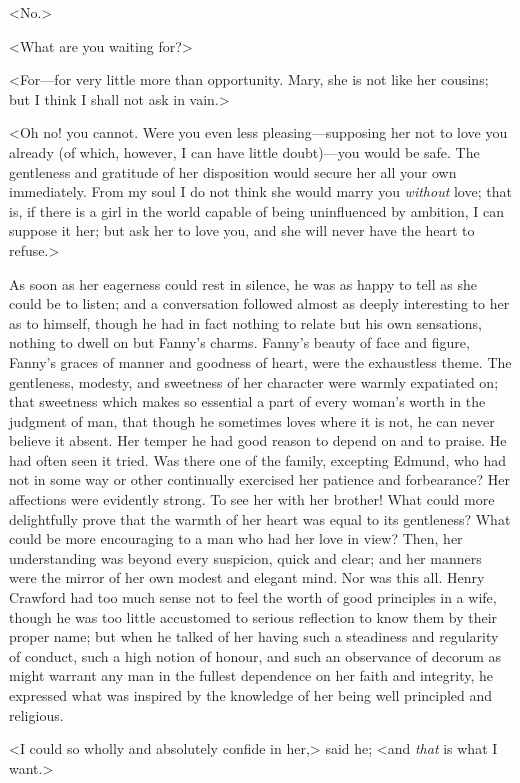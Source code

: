 <No.>

<What are you waiting for?>

<For—for very little more than opportunity. Mary, she is not like her cousins; but I think I shall not ask in vain.>

<Oh no! you cannot. Were you even less pleasing—supposing her not to love you already (of which, however, I can have little doubt)—you would be safe. The gentleness and gratitude of her disposition would secure her all your own immediately. From my soul I do not think she would marry you \textit{without}  love; that is, if there is a girl in the world capable of being uninfluenced by ambition, I can suppose it her; but ask her to love you, and she will never have the heart to refuse.>

As soon as her eagerness could rest in silence, he was as happy to tell as she could be to listen; and a conversation followed almost as deeply interesting to her as to himself, though he had in fact nothing to relate but his own sensations, nothing to dwell on but Fanny's charms. Fanny's beauty of face and figure, Fanny's graces of manner and goodness of heart, were the exhaustless theme. The gentleness, modesty, and sweetness of her character were warmly expatiated on; that sweetness which makes so essential a part of every woman's worth in the judgment of man, that though he sometimes loves where it is not, he can never believe it absent. Her temper he had good reason to depend on and to praise. He had often seen it tried. Was there one of the family, excepting Edmund, who had not in some way or other continually exercised her patience and forbearance? Her affections were evidently strong. To see her with her brother! What could more delightfully prove that the warmth of her heart was equal to its gentleness? What could be more encouraging to a man who had her love in view? Then, her understanding was beyond every suspicion, quick and clear; and her manners were the mirror of her own modest and elegant mind. Nor was this all. Henry Crawford had too much sense not to feel the worth of good principles in a wife, though he was too little accustomed to serious reflection to know them by their proper name; but when he talked of her having such a steadiness and regularity of conduct, such a high notion of honour, and such an observance of decorum as might warrant any man in the fullest dependence on her faith and integrity, he expressed what was inspired by the knowledge of her being well principled and religious.

<I could so wholly and absolutely confide in her,> said he; <and \textit{that}  is what I want.>

